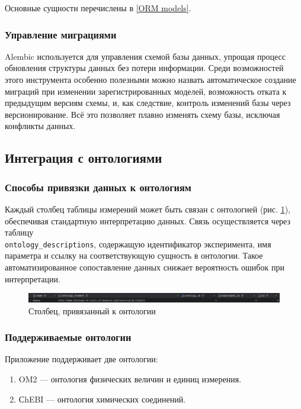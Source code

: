 Основные сущности перечислены в \ref{ORM models}.

\subsubsection{Управление миграциями}

Alembic используется для управления схемой базы данных, упрощая процесс обновления структуры данных без потери информации. Среди возможностей этого инструмента особенно полезными можно назвать автоматическое создание миграций при изменении зарегистрированных моделей, возможность отката к предыдущим версиям схемы, и, как следствие, контроль изменений базы через версионирование. Всё это позволяет плавно изменять схему базы, исключая конфликты данных.

\subsection{Интеграция с онтологиями}

\subsubsection{Способы привязки данных к онтологиям}

Каждый столбец таблицы измерений может быть связан с онтологией (рис. \ref{pic:linked_to_ontology_column}), обеспечивая стандартную интерпретацию данных. Связь осуществляется через таблицу \\
\texttt{ontology\_descriptions}, содержащую идентификатор эксперимента, имя параметра и ссылку на соответствующую сущность в онтологии. Такое автоматизированное сопоставление данных снижает вероятность ошибок при интерпретации.

\begin{figure}[H]
    \centering
    \includegraphics[width=\linewidth]{img/ontology_linking.png}
    \caption{Столбец, привязанный к онтологии}
    \label{pic:linked_to_ontology_column}
\end{figure}
\vspace{0.5cm}

\subsubsection{Поддерживаемые онтологии}

Приложение поддерживает две онтологии:
\begin{enumerate}
    \item OM2 — онтология физических величин и единиц измерения.
    \item СhEBI — онтология химических соединений.
\end{enumerate}

